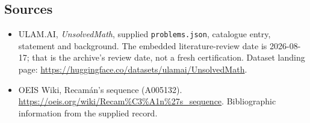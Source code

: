 \documentclass[11pt,a4paper]{article}
\begin{document}
\subsection{Sources}

{\small

\begin{itemize}

\item[\hypertarget{source:statement:1}{S1}] ULAM.AI, \emph{UnsolvedMath}, supplied \texttt{problems.json}, catalogue entry, statement and background. The embedded literature-review date is 2026-08-17; that is the archive’s review date, not a fresh certification. Dataset landing page: \url{https://huggingface.co/datasets/ulamai/UnsolvedMath}.

\item[\hypertarget{source:statement:2}{S2}] OEIS Wiki, Recamán's sequence (A005132). \url{https://oeis.org/wiki/Recam%C3%A1n%27s_sequence}. Bibliographic information from the supplied record.

\end{itemize}

}

\label{end:statement}
\end{document}
